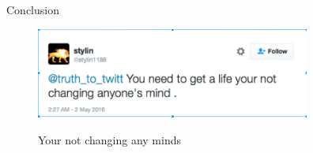 \documentclass[10pt]{beamer}\usepackage[]{graphicx}\usepackage[]{color}
\begin{document}
\begin{frame}{Conclusion}

\begin{figure}
\includegraphics[width=9cm]{../minds.png}
\label{fig:minds}
\caption{Your not changing any minds}
\end{figure}

\end{frame}
		
\end{document}
